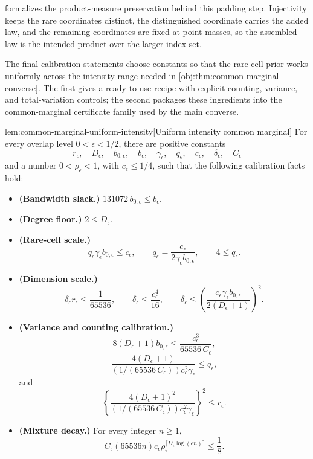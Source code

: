 \documentclass[11pt]{article}
\begin{document}
 formalizes the product-measure preservation behind this padding step. Injectivity keeps the rare coordinates distinct, the distinguished coordinate carries the added law, and the remaining coordinates are fixed at point masses, so the assembled law is the intended product over the larger index set.

The final calibration statements choose constants so that the rare-cell prior works uniformly across the intensity range needed in \cref{obj:thm:common-marginal-converse}. The first gives a ready-to-use recipe with explicit counting, variance, and total-variation controls; the second packages these ingredients into the common-marginal certificate family used by the main converse.

\begin{lemmav}{lem:common-marginal-uniform-intensity}[Uniform intensity common marginal]
For every overlap level \(0<\epsilon<1/2\), there are positive constants
\[
r_\epsilon,\quad D_\epsilon,\quad b_{0,\epsilon},\quad b_\epsilon,\quad
\gamma_\epsilon,\quad q_\epsilon,\quad c_\epsilon,\quad \delta_\epsilon,\quad C_\epsilon
\]
and a number \(0<\rho_\epsilon<1\), with \(c_\epsilon\le 1/4\), such that the following calibration facts hold:
\begin{itemize}
\item \textbf{(Bandwidth slack.)} \(131072\,b_{0,\epsilon}\le b_\epsilon\).
\item \textbf{(Degree floor.)} \(2\le D_\epsilon\).
\item \textbf{(Rare-cell scale.)}
\[
q_\epsilon\gamma_\epsilon b_{0,\epsilon}\le c_\epsilon,
\qquad
q_\epsilon=
\frac{c_\epsilon}{2\gamma_\epsilon b_{0,\epsilon}},
\qquad
4\le q_\epsilon .
\]
\item \textbf{(Dimension scale.)}
\[
\delta_\epsilon r_\epsilon\le \frac1{65536},
\qquad
\delta_\epsilon\le \frac{c_\epsilon^4}{16},
\qquad
\delta_\epsilon\le
\left(\frac{c_\epsilon\gamma_\epsilon b_{0,\epsilon}}
{2(D_\epsilon+1)}\right)^2 .
\]
\item \textbf{(Variance and counting calibration.)}
\[
8(D_\epsilon+1)b_{0,\epsilon}
\le \frac{c_\epsilon^3}{65536\,C_\epsilon},
\]
\[
\frac{4(D_\epsilon+1)}
{(1/(65536\,C_\epsilon))c_\epsilon^2\gamma_\epsilon}
\le q_\epsilon,
\]
and
\[
\left\{
\frac{4(D_\epsilon+1)^2}
{(1/(65536\,C_\epsilon))c_\epsilon^2\gamma_\epsilon}
\right\}^2
\le r_\epsilon .
\]
\item \textbf{(Mixture decay.)} For every integer \(n\ge1\),
\[
C_\epsilon(65536n)c_\epsilon
\rho_\epsilon^{\lceil D_\epsilon\log(en)\rceil}
\le \frac18 .
\]
\end{itemize}


\end{lemmav}
\end{document}
